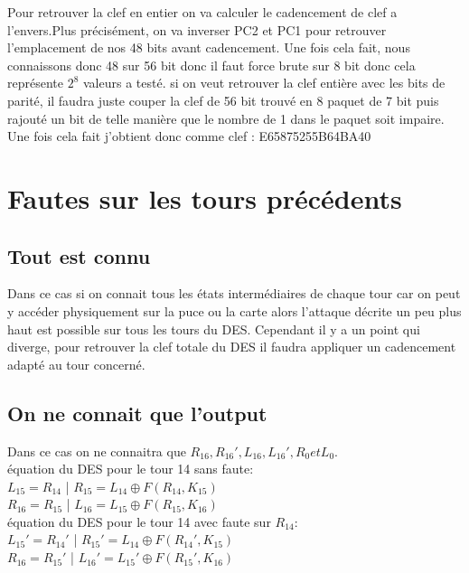 \documentclass[a4paper]{report}
\begin{document}
			Pour retrouver la clef en entier on va calculer le cadencement de clef a l'envers.Plus précisément, on va inverser PC2 et PC1 pour retrouver l'emplacement de nos 48 bits avant cadencement. Une fois cela fait, nous connaissons donc 48 sur 56 bit donc il faut force brute sur 8 bit donc cela représente $2^{8}$ valeurs a testé. si on veut retrouver la clef entière avec les bits de parité, il faudra juste couper la clef de 56 bit trouvé en 8 paquet de 7 bit puis rajouté un bit de telle manière que le nombre de 1 dans le paquet soit impaire.\\
			Une fois cela fait j'obtient donc comme clef : E65875255B64BA40
		
		\chapter{Fautes sur les tours précédents}
			\section{Tout est connu}
			Dans ce cas si on connait tous les états intermédiaires de chaque tour car on peut y accéder physiquement sur la puce ou la carte alors l'attaque décrite un peu plus haut est possible sur tous les tours du DES. Cependant il y a un point qui diverge, pour retrouver la clef totale du DES il faudra appliquer un cadencement adapté au tour concerné.
			
			\section{On ne connait que l'output}
			Dans ce cas on ne connaitra que $R_{16},R_{16}',L_{16},L_{16}',R_{0} et L_{0}$.\\
			équation du DES pour le tour 14 sans faute:\\
			$L_{15}=R_{14}$ | $R_{15}=L_{14}\oplus F(R_{14},K_{15})$\\
			$R_{16}=R_{15}$ | $L_{16}=L_{15}\oplus F(R_{15},K_{16})$\\
			équation du DES pour le tour 14 avec faute sur $R_{14}$:\\
			$L_{15}'=R_{14}'$ | $R_{15}'=L_{14}\oplus F(R_{14}',K_{15})$\\
			$R_{16}=R_{15}'$ | $L_{16}'=L_{15}'\oplus F(R_{15}',K_{16})$\\
			
\end{document}
